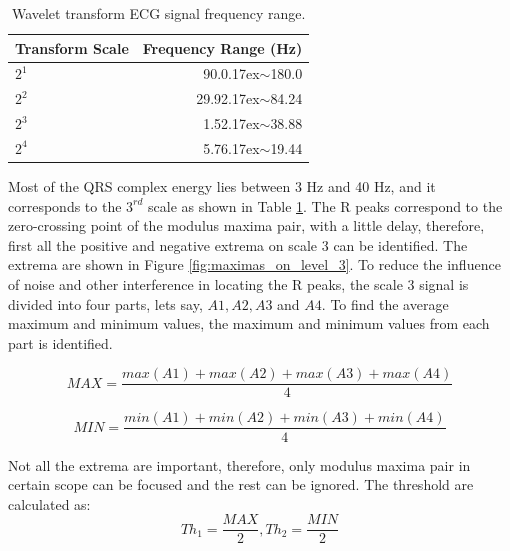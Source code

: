 \renewcommand{\arraystretch}{2}
\begin{table}[h]
	\caption{Wavelet transform ECG signal frequency range\cite{shang2014qrs}.} \label{tab:qrsenergy}
	
	\begin{center}
		\begin{tabular}{ | l | r | }
			\hline
			Transform Scale & Frequency Range (Hz) \\ \hline
			${2^1}$  & 90.0{\raise.17ex\hbox{$\scriptstyle\sim$}}180.0 \\ \hline
			${2^2}$  & 29.92{\raise.17ex\hbox{$\scriptstyle\sim$}}84.24  \\ \hline
			${2^3}$  & 1.52{\raise.17ex\hbox{$\scriptstyle\sim$}}38.88  \\ \hline
			${2^4}$  & 5.76{\raise.17ex\hbox{$\scriptstyle\sim$}}19.44  \\ 
			\hline
		\end{tabular}
	\end{center}
	
\end{table}

Most of the QRS complex energy lies between 3 Hz and 40 Hz, and it corresponds to the $3^{rd}$ scale as shown in Table \ref{tab:qrsenergy}. The R peaks correspond to the zero-crossing point of the modulus maxima pair, with a little delay, therefore, first all the positive and negative extrema on scale 3 can be identified. The extrema are shown in Figure \ref{fig:maximas_on_level_3}.  To reduce the influence of noise and other interference in locating the R peaks, the scale 3 signal is divided into four parts, lets say, $A1, A2, A3$ and $A4$. To find the average maximum and minimum values, the maximum and minimum values from each part is identified.


\begin{equation} 
{ MAX = \frac{max(A1) + max(A2) + max(A3) + max(A4)}{4}}
\end{equation}


\begin{equation} 
{ MIN = \frac{min(A1) + min(A2) + min(A3) + min(A4)}{4}}
\end{equation}


Not all the extrema are important, therefore, only modulus maxima pair in certain scope can be focused and the rest can be ignored. The threshold are calculated as:
\begin{equation} 
{ Th_1 = \frac{MAX}{2}} , { Th_2 = \frac{MIN}{2}} 
\end{equation}

